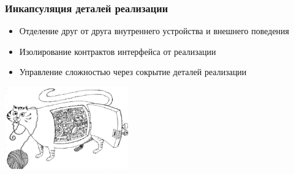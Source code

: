 \documentclass{../../slides-style}
\begin{document}
    \begin{frame}
        \frametitle{Инкапсуляция деталей реализации}
        \begin{itemize}
            \item Отделение друг от друга внутреннего устройства и внешнего поведения
            \item Изолирование контрактов интерфейса от реализации
            \item Управление сложностью через сокрытие деталей реализации
        \end{itemize}
        \vskip 1.5cm
        \begin{center}
            \includegraphics[width=0.4\textwidth]{incapsulation.png}
        \end{center}
    \end{frame}
\end{document}
